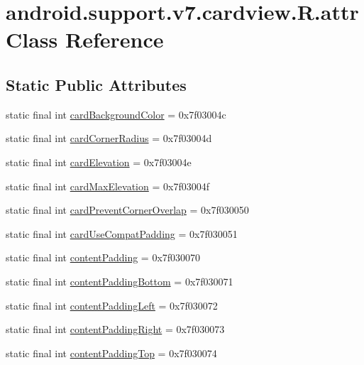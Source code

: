 \hypertarget{classandroid_1_1support_1_1v7_1_1cardview_1_1R_1_1attr}{}\section{android.\+support.\+v7.\+cardview.\+R.\+attr Class Reference}
\label{classandroid_1_1support_1_1v7_1_1cardview_1_1R_1_1attr}
\subsection*{Static Public Attributes}
\begin{DoxyCompactItemize}
\item 
static final int \mbox{\hyperlink{classandroid_1_1support_1_1v7_1_1cardview_1_1R_1_1attr_a40f81af90f6a76a95be21af96868b128}{card\+Background\+Color}} = 0x7f03004c
\item 
static final int \mbox{\hyperlink{classandroid_1_1support_1_1v7_1_1cardview_1_1R_1_1attr_ad45cf9ae9b7c4ee6e77cbbd3d160d35e}{card\+Corner\+Radius}} = 0x7f03004d
\item 
static final int \mbox{\hyperlink{classandroid_1_1support_1_1v7_1_1cardview_1_1R_1_1attr_a9957fff6db463fb00cd1589d732c5a65}{card\+Elevation}} = 0x7f03004e
\item 
static final int \mbox{\hyperlink{classandroid_1_1support_1_1v7_1_1cardview_1_1R_1_1attr_ada84bd33fd0a4bb39d97f25e5349a936}{card\+Max\+Elevation}} = 0x7f03004f
\item 
static final int \mbox{\hyperlink{classandroid_1_1support_1_1v7_1_1cardview_1_1R_1_1attr_ab00fa42b846cbad081897bce1965676a}{card\+Prevent\+Corner\+Overlap}} = 0x7f030050
\item 
static final int \mbox{\hyperlink{classandroid_1_1support_1_1v7_1_1cardview_1_1R_1_1attr_a3b4d274b7495a6fdeee1633fc0e87d0b}{card\+Use\+Compat\+Padding}} = 0x7f030051
\item 
static final int \mbox{\hyperlink{classandroid_1_1support_1_1v7_1_1cardview_1_1R_1_1attr_aed13eb86fec91219e422de7ad9463c82}{content\+Padding}} = 0x7f030070
\item 
static final int \mbox{\hyperlink{classandroid_1_1support_1_1v7_1_1cardview_1_1R_1_1attr_a73c69b6954424b9e8606c430a88ebcfe}{content\+Padding\+Bottom}} = 0x7f030071
\item 
static final int \mbox{\hyperlink{classandroid_1_1support_1_1v7_1_1cardview_1_1R_1_1attr_afc6bb56349f0261be4ad8e763994e87a}{content\+Padding\+Left}} = 0x7f030072
\item 
static final int \mbox{\hyperlink{classandroid_1_1support_1_1v7_1_1cardview_1_1R_1_1attr_a9cf77d62298ec7a22e44411c2897f2b0}{content\+Padding\+Right}} = 0x7f030073
\item 
static final int \mbox{\hyperlink{classandroid_1_1support_1_1v7_1_1cardview_1_1R_1_1attr_ae0bf28844236b53e4706c69c0494722e}{content\+Padding\+Top}} = 0x7f030074
\end{DoxyCompactItemize}


